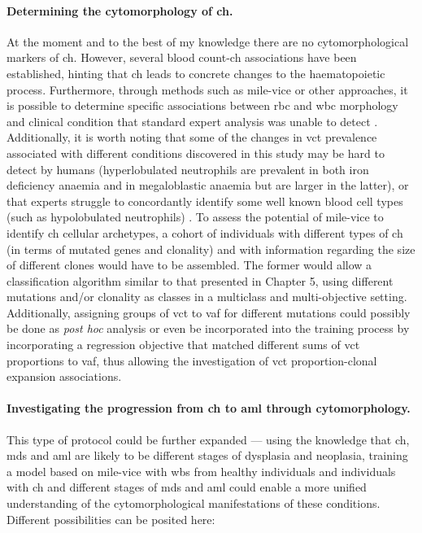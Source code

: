 \paragraph{Determining the cytomorphology of \ac{ch}.} At the moment and to the best of my knowledge there are no cytomorphological markers of \ac{ch}. However, several blood count-\ac{ch} associations have been established, hinting that \ac{ch} leads to concrete changes to the haematopoietic process. Furthermore, through methods such as \ac{mile-vice} or other approaches, it is possible to determine specific associations between \ac{rbc} and \ac{wbc} morphology and clinical condition that standard expert analysis was unable to detect \cite{Eckardt2021-fb,Bruck2021-fx}. Additionally, it is worth noting that some of the changes in \ac{vct} prevalence associated with different conditions discovered in this study may be hard to detect by humans (hyperlobulated neutrophils are prevalent in both iron deficiency anaemia and in megaloblastic anaemia but are larger in the latter), or that experts struggle to concordantly identify some well known blood cell types (such as hypolobulated neutrophils) \cite{Weinberg2015-ra}. To assess the potential of \ac{mile-vice} to identify \ac{ch} cellular archetypes, a cohort of individuals with different types of \ac{ch} (in terms of mutated genes and clonality) and with information regarding the size of different clones would have to be assembled. The former would allow a classification algorithm similar to that presented in Chapter 5, using different mutations and/or clonality as classes in a multiclass and multi-objective setting. Additionally, assigning groups of \ac{vct} to \ac{vaf} for different mutations could possibly be done as \textit{post hoc} analysis or even be incorporated into the training process by incorporating a regression objective that matched different sums of \ac{vct} proportions to \ac{vaf}, thus allowing the investigation of \ac{vct} proportion-clonal expansion associations.

\paragraph{Investigating the progression from \ac{ch} to \ac{aml} through cytomorphology.} This type of protocol could be further expanded --- using the knowledge that \ac{ch}, \ac{mds} and \ac{aml} are likely to be different stages of dysplasia and neoplasia, training a model based on \ac{mile-vice} with \ac{wbs} from healthy individuals and individuals with \ac{ch} and different stages of \ac{mds} and \ac{aml} could enable a more unified understanding of the cytomorphological manifestations of these conditions. Different possibilities can be posited here:

